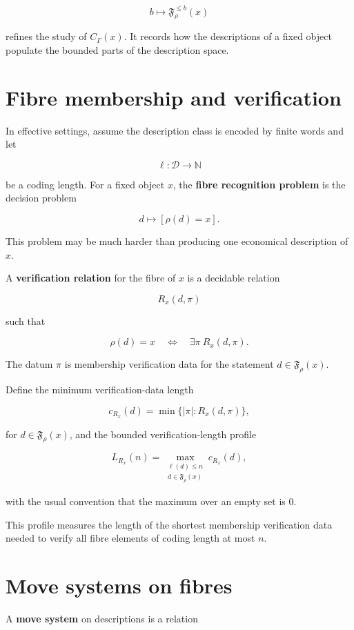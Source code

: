 \documentclass[11pt]{article}
\begin{document}
\[
b\mapsto \mathfrak F_\rho^{\leq b}(x)
\]

refines the study of \(C_\Gamma(x)\). It records how the descriptions of a fixed object populate the bounded parts of the description space.


\section{Fibre membership and verification}

In effective settings, assume the description class is encoded by finite words and let

\[
\ell:\mathcal D\to\mathbb N
\]

be a coding length. For a fixed object \(x\), the \textbf{fibre recognition problem} is the decision problem

\[
d\longmapsto [\rho(d)=x].
\]

This problem may be much harder than producing one economical description of \(x\).

A \textbf{verification relation} for the fibre of \(x\) is a decidable relation

\[
R_x(d,\pi)
\]

such that

\[
\rho(d)=x
\quad\Longleftrightarrow\quad
\exists \pi\ R_x(d,\pi).
\]

The datum \(\pi\) is membership verification data for the statement \(d\in\mathfrak F_\rho(x)\).

Define the minimum verification-data length

\[
c_{R_x}(d)=\min\{|\pi|:R_x(d,\pi)\},
\]

for \(d\in\mathfrak F_\rho(x)\), and the bounded verification-length profile

\[
L_{R_x}(n)=
\max_{\substack{\ell(d)\leq n\\ d\in\mathfrak F_\rho(x)}}
c_{R_x}(d),
\]

with the usual convention that the maximum over an empty set is \(0\).

This profile measures the length of the shortest membership verification data needed to verify all fibre elements of coding length at most \(n\).


\section{Move systems on fibres}

A \textbf{move system} on descriptions is a relation
\end{document}
